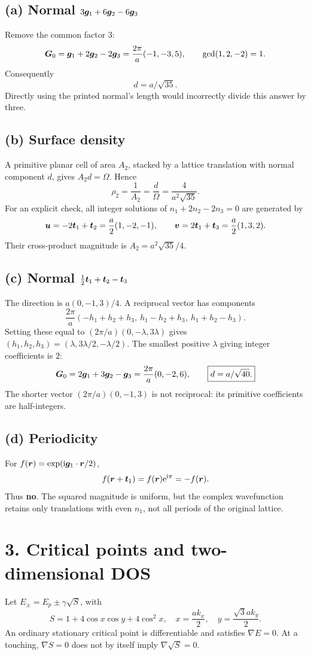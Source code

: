 \subsection*{(a) Normal $3\boldsymbol{g}_1+6\boldsymbol{g}_2-6\boldsymbol{g}_3$}
Remove the common factor $3$:
\[
\boldsymbol{G}_0=\boldsymbol{g}_1+2\boldsymbol{g}_2-2\boldsymbol{g}_3
=\frac{2\pi}{a}(-1,-3,5),\qquad\gcd(1,2,-2)=1.
\]
Consequently
\[
\boxed{d=a/\sqrt{35}.}
\]
Directly using the printed normal's length would incorrectly divide this answer by three.

\subsection*{(b) Surface density}
A primitive planar cell of area $A_2$, stacked by a lattice translation with normal component $d$, gives $A_2d=\Omega$. Hence
\[
\boxed{\rho_2=\frac1{A_2}=\frac d\Omega=\frac4{a^2\sqrt{35}}.}
\]
For an explicit check, all integer solutions of $n_1+2n_2-2n_3=0$ are generated by
\[
\boldsymbol{u}=-2\boldsymbol{t}_1+\boldsymbol{t}_2=\frac a2(1,-2,-1),\qquad
\boldsymbol{v}=2\boldsymbol{t}_1+\boldsymbol{t}_3=\frac a2(1,3,2).
\]
Their cross-product magnitude is $A_2=a^2\sqrt{35}/4$.

\subsection*{(c) Normal $\tfrac12\boldsymbol{t}_1+\boldsymbol{t}_2-\boldsymbol{t}_3$}
The direction is $a(0,-1,3)/4$. A reciprocal vector has components
\[
\frac{2\pi}{a}(-h_1+h_2+h_3,\ h_1-h_2+h_3,\ h_1+h_2-h_3).
\]
Setting these equal to $(2\pi/a)(0,-\lambda,3\lambda)$ gives $(h_1,h_2,h_3)=(\lambda,3\lambda/2,-\lambda/2)$. The smallest positive $\lambda$ giving integer coefficients is $2$:
\[
\boldsymbol{G}_0=2\boldsymbol{g}_1+3\boldsymbol{g}_2-\boldsymbol{g}_3=\frac{2\pi}{a}(0,-2,6),
\qquad\boxed{d=a/\sqrt{40}.}
\]
The shorter vector $(2\pi/a)(0,-1,3)$ is not reciprocal: its primitive coefficients are half-integers.

\subsection*{(d) Periodicity}
For $f(\boldsymbol{r})=\exp(\mathrm{i}\boldsymbol{g}_1\cdot\boldsymbol{r}/2)$,
\[
f(\boldsymbol{r}+\boldsymbol{t}_1)=f(\boldsymbol{r})\mathrm{e}^{\mathrm{i}\pi}=-f(\boldsymbol{r}).
\]
Thus \textbf{no}. The squared magnitude is uniform, but the complex wavefunction retains only translations with even $n_1$, not all periods of the original lattice.

\section*{3. Critical points and two-dimensional DOS}
Let $E_\pm=E_p\pm\gamma\sqrt S$, with
\[
S=1+4\cos x\cos y+4\cos^2x,\quad x=\frac{ak_x}{2},\quad y=\frac{\sqrt3ak_y}{2}.
\]
An ordinary stationary critical point is differentiable and satisfies $\nabla E=0$. At a touching, $\nabla S=0$ does not by itself imply $\nabla\sqrt S=0$.

